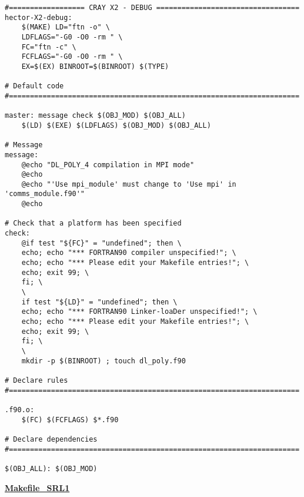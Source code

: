 \begin{verbatim}
#================== CRAY X2 - DEBUG ==================================
hector-X2-debug:
	$(MAKE) LD="ftn -o" \
	LDFLAGS="-G0 -O0 -rm " \
	FC="ftn -c" \
	FCFLAGS="-G0 -O0 -rm " \
	EX=$(EX) BINROOT=$(BINROOT) $(TYPE)

# Default code
#=====================================================================

master: message check $(OBJ_MOD) $(OBJ_ALL)
	$(LD) $(EXE) $(LDFLAGS) $(OBJ_MOD) $(OBJ_ALL)

# Message
message:
	@echo "DL_POLY_4 compilation in MPI mode"
	@echo
	@echo "'Use mpi_module' must change to 'Use mpi' in 'comms_module.f90'"
	@echo

# Check that a platform has been specified
check:
	@if test "${FC}" = "undefined"; then \
	echo; echo "*** FORTRAN90 compiler unspecified!"; \
	echo; echo "*** Please edit your Makefile entries!"; \
	echo; exit 99; \
	fi; \
	\
	if test "${LD}" = "undefined"; then \
	echo; echo "*** FORTRAN90 Linker-loaDer unspecified!"; \
	echo; echo "*** Please edit your Makefile entries!"; \
	echo; exit 99; \
	fi; \
	\
	mkdir -p $(BINROOT) ; touch dl_poly.f90

# Declare rules
#=====================================================================

.f90.o:
	$(FC) $(FCFLAGS) $*.f90

# Declare dependencies
#=====================================================================

$(OBJ_ALL): $(OBJ_MOD)
\end{verbatim}
\clearpage
{\sc \bf \underline{Makefile\_SRL1}}
